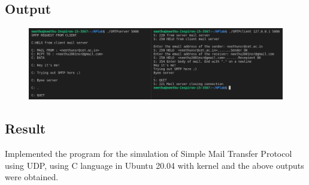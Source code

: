 \subsection{Output}
\begin{figure}[h]
            \centering
            \includegraphics[scale=0.45]{img/exp11.png}
\end{figure}

\subsection{Result}
Implemented the program for the simulation of Simple Mail Transfer Protocol using UDP, using C language in Ubuntu 20.04 with kernel and the above outputs were obtained.

